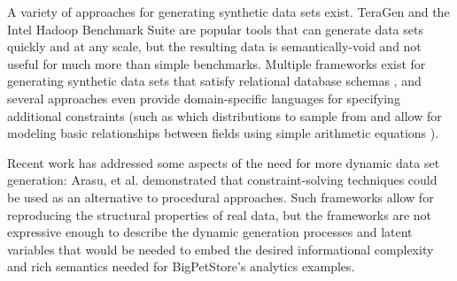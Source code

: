 \documentclass[conference]{IEEEtran}
\begin{document}


A variety of approaches for generating synthetic data sets exist.  TeraGen and the Intel Hadoop Benchmark Suite \cite{Huang2010} are popular tools that can generate data sets quickly and at any scale, but the resulting data is semantically-void and not useful for much more than simple benchmarks.  Multiple frameworks exist for generating synthetic data sets that satisfy relational database schemas \cite{Ghazal2013,Rabl2011a,Frank2012,Rabl2011,Gray1994,Bruno2005,Hoag2007}, and several approaches even provide domain-specific languages \cite{Bruno2005,Hoag2007} for specifying additional constraints (such as which distributions to sample from and allow for modeling basic relationships between fields using simple arithmetic equations \cite{Alexandrov2012}).

Recent work has addressed some aspects of the need for more dynamic data set generation: Arasu, et al. \cite{Arasu2011} demonstrated that constraint-solving techniques could be used as an alternative to procedural approaches. Such frameworks allow for reproducing the structural properties of real data, but the frameworks are not expressive enough to describe the dynamic generation processes and latent variables that would be needed to embed the desired informational complexity and rich semantics needed for BigPetStore's analytics examples.
\end{document}
